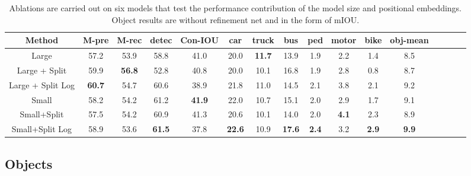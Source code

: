 \documentclass[10pt,twocolumn,letterpaper]{article}
\begin{document}
\begin{table*}[ht]

\begin{center}
{
\begin{tabular}{ |c|c|c|c|c|c|c|c|c|c|c|c|c|c|c|c| }
\hline
Method & M-pre & M-rec& detec & Con-IOU & car & truck & bus & ped & motor & bike & obj-mean\\
\hline
Large &  57.2 & 53.9& 58.8 & 41.0 & 20.0 & \textbf{11.7} &13.9 &  1.9 & 2.2 & 1.4 & 8.5\\
Large + Split&   59.9 & \textbf{56.8} & 52.8 & 40.8 & 20.0 & 10.1 & 16.8 &   1.9 & 2.8 & 0.8 &  8.7\\

Large + Split Log & \textbf{60.7} & 54.7 & 60.6 & 38.9 & 21.8 & 11.0 & 14.5 &  2.1 & 3.8 & 2.1 &  9.2\\



Small & 58.2 & 54.2 & 61.2 & \textbf{41.9} & 22.0 & 10.7 &15.1  & 2.0 & 2.9 & 1.7&  9.1 \\

Small+Split & 57.5 & 54.2 & 60.9 & 41.3 & 20.6 & 10.1 &14.0 &  2.0 & \textbf{4.1} & 2.3 & 8.9 \\
Small+Split Log & 58.9 & 53.6 & \textbf{61.5} & 37.8 & \textbf{22.6} & 10.9 & \textbf{17.6}  & \textbf{2.4} & 3.2 & \textbf{2.9}  & \textbf{9.9}\\
\hline
\end{tabular}
}
\end{center}
\caption{Ablations are carried out on six models that test the performance contribution of the model size and positional embeddings. Object results are without refinement net and in the form of mIOU.}
\label{tab:ablation}
\end{table*}

\subsection{Objects}
\end{document}
